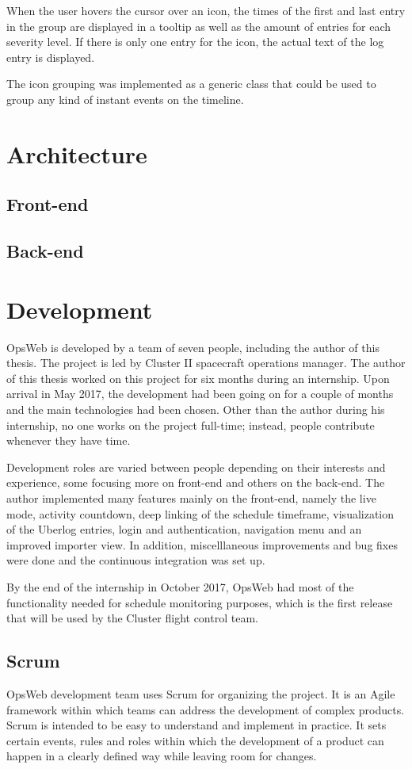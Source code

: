 When the user hovers the cursor over an icon, the times of the first and last entry in the group are displayed in a tooltip as well as the amount of entries for each severity level. If there is only one entry for the icon, the actual text of the log entry is displayed.

The icon grouping was implemented as a generic class that could be used to group any kind of instant events on the timeline.
\section{Architecture}
\subsection{Front-end}
\subsection{Back-end}
\section{Development}
OpsWeb is developed by a team of seven people, including the author of this thesis. The project is led by Cluster II spacecraft operations manager. The author of this thesis worked on this project for six months during an internship. Upon arrival in May 2017, the development had been going on for a couple of months and the main technologies had been chosen. Other than the author during his internship, no one works on the project full-time; instead, people contribute whenever they have time.

Development roles are varied between people depending on their interests and experience, some focusing more on front-end and others on the back-end. The author implemented many features mainly on the front-end, namely the live mode, activity countdown, deep linking of the schedule timeframe, visualization of the Uberlog entries, login and authentication, navigation menu and an improved importer view. In addition, miscelllaneous improvements and bug fixes were done and the continuous integration was set up.

By the end of the internship in October 2017, OpsWeb had most of the functionality needed for schedule monitoring purposes, which is the first release that will be used by the Cluster flight control team.
\subsection{Scrum}
OpsWeb development team uses Scrum for organizing the project. It is an Agile framework within which teams can address the development of complex products. Scrum is intended to be easy to understand and implement in practice. It sets certain events, rules and roles within which the development of a product can happen in a clearly defined way while leaving room for changes. \cite{beck2001manifesto} \cite{scrum}
